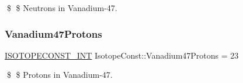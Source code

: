 \$ \$ Neutrons in Vanadium-\/47. \mbox{\label{group___isotope_const-_vanadium-_v47_gaa086a6a273e88aa04c59a4c5eb66c753}} 
\subsubsection{\texorpdfstring{Vanadium47\+Protons}{Vanadium47Protons}}
{\footnotesize\ttfamily \mbox{\hyperlink{group___isotope_const-_macros_ga5f18360b3e99483a35c32d789e62621c}{I\+S\+O\+T\+O\+P\+E\+C\+O\+N\+S\+T\+\_\+\+I\+NT}} Isotope\+Const\+::\+Vanadium47\+Protons = 23}

\$ \$ Protons in Vanadium-\/47. 